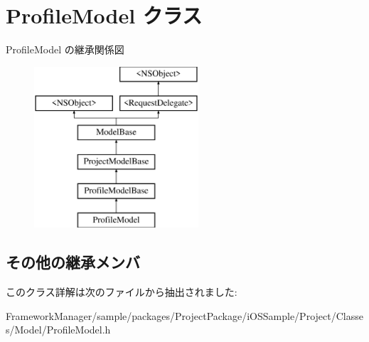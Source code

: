 \hypertarget{interface_profile_model}{}\section{Profile\+Model クラス}
\label{interface_profile_model}
Profile\+Model の継承関係図\begin{figure}[H]
\begin{center}
\leavevmode
\includegraphics[height=6.000000cm]{interface_profile_model}
\end{center}
\end{figure}
\subsection*{その他の継承メンバ}


このクラス詳解は次のファイルから抽出されました\+:\begin{DoxyCompactItemize}
\item 
Framework\+Manager/sample/packages/\+Project\+Package/i\+O\+S\+Sample/\+Project/\+Classes/\+Model/Profile\+Model.\+h\end{DoxyCompactItemize}
